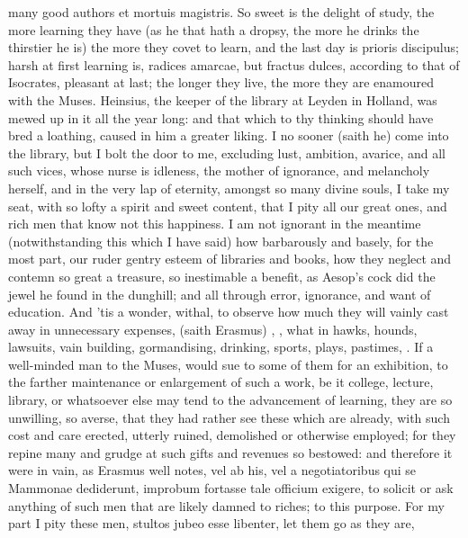 {many good authors et mortuis magistris. So sweet is the delight of
study, the more learning they have (as he that hath a dropsy, the more
he drinks the thirstier he is) the more they covet to learn, and the
last day is prioris discipulus; harsh at first learning is, radices
amarcae, but fractus dulces, according to that of Isocrates, pleasant
at last; the longer they live, the more they are enamoured with the
Muses. Heinsius, the keeper of the library at Leyden in Holland, was
mewed up in it all the year long: and that which to thy thinking should
have bred a loathing, caused in him a greater liking. I no sooner
(saith he) come into the library, but I bolt the door to me, excluding
lust, ambition, avarice, and all such vices, whose nurse is idleness,
the mother of ignorance, and melancholy herself, and in the very lap of
eternity, amongst so many divine souls, I take my seat, with so lofty a
spirit and sweet content, that I pity all our great ones, and rich men
that know not this happiness. I am not ignorant in the meantime
(notwithstanding this which I have said) how barbarously and basely,
for the most part, our ruder gentry esteem of libraries and books, how
they neglect and contemn so great a treasure, so inestimable a benefit,
as Aesop's cock did the jewel he found in the dunghill; and all through
error, ignorance, and want of education. And 'tis a wonder, withal, to
observe how much they will vainly cast away in unnecessary expenses,
 (saith Erasmus) , \etc{}, what in
hawks, hounds, lawsuits, vain building, gormandising, drinking, sports,
plays, pastimes, \etc{}. If a well-minded man to the Muses, would sue to
some of them for an exhibition, to the farther maintenance or
enlargement of such a work, be it college, lecture, library, or
whatsoever else may tend to the advancement of learning, they are so
unwilling, so averse, that they had rather see these which are already,
with such cost and care erected, utterly ruined, demolished or
otherwise employed; for they repine many and grudge at such gifts and
revenues so bestowed: and therefore it were in vain, as Erasmus well
notes, vel ab his, vel a negotiatoribus qui se Mammonae dediderunt,
improbum fortasse tale officium exigere, to solicit or ask anything of
such men that are likely damned to riches; to this purpose. For my part
I pity these men, stultos jubeo esse libenter, let them go as they are,
}
